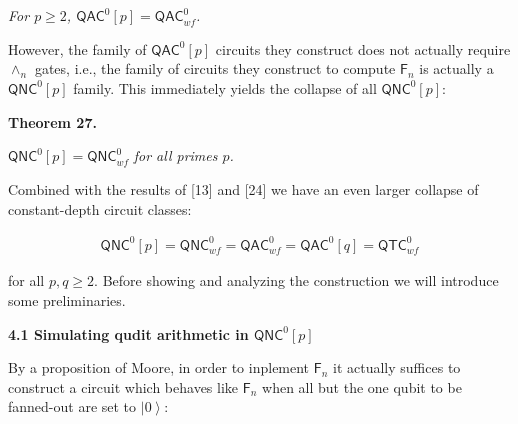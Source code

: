 \documentclass[10pt,a4paper]{article}
\begin{document}
\emph{For $p\geq 2$, ${\mathsf{QAC}}^{0}[p]={\mathsf{QAC}}^{0}_{wf}$.}\par






However, the family of ${\mathsf{QAC}}^{0}[p]$ circuits they construct does not actually require $\wedge_{n}$ gates, i.e., the family of circuits they construct to compute $\mathsf{F}_{n}$ is actually a ${\mathsf{QNC}}^{0}[p]$ family. This immediately yields the collapse of all ${\mathsf{QNC}}^{0}[p]$:\par






\par\medskip\noindent\textbf{
\textbf{Theorem 27}\textbf{.}
}\par



${\mathsf{QNC}}^{0}[p]={\mathsf{QNC}}^{0}_{wf}$\emph{ for all primes $p$.}\par







Combined with the results of [13] and [24] we have an even larger collapse of constant-depth circuit classes:\par


\[\begin{gathered}
{\mathsf{QNC}}^{0}[p]={\mathsf{QNC}}^{0}_{wf}={\mathsf{QAC}}^{0}_{wf}={\mathsf{QAC}}^{0}[q]={\mathsf{QTC}}^{0}_{wf}
\end{gathered}\]


for all $p,q\geq 2$. Before showing and analyzing the construction we will introduce some preliminaries.\par




\par\medskip\noindent\textbf{
4.1 Simulating qudit arithmetic in ${\mathsf{QNC}}^{0}[p]$
}\par




By a proposition of Moore, in order to inplement $\mathsf{F}_{n}$ it actually suffices to construct a circuit which behaves like $\mathsf{F}_{n}$ when all but the one qubit to be fanned-out are set to $\left|0\right\rangle$:\par
\end{document}
